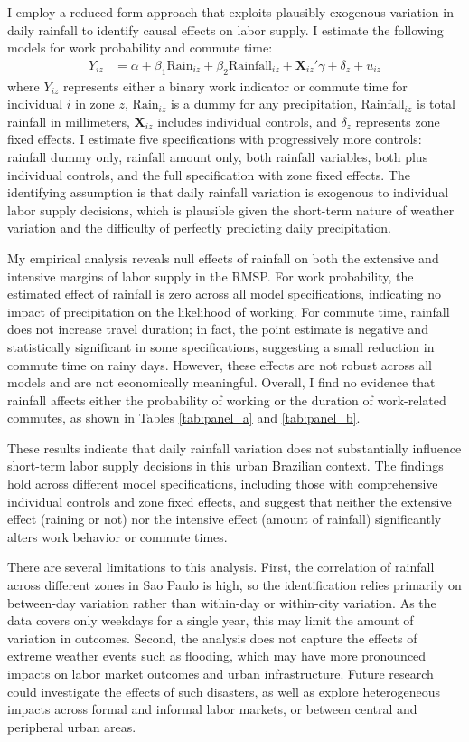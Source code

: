 I employ a reduced-form approach that exploits plausibly exogenous variation in daily rainfall to identify causal effects on labor supply. I estimate the following models for work probability and commute time:
\begin{align*}
Y_{iz} &= \alpha + \beta_1 \text{Rain}_{iz} + \beta_2 \text{Rainfall}_{iz} + \mathbf{X}_{iz}'\gamma + \delta_z + u_{iz}
\end{align*}
where $Y_{iz}$ represents either a binary work indicator or commute time for individual $i$ in zone $z$, $\text{Rain}_{iz}$ is a dummy for any precipitation, $\text{Rainfall}_{iz}$ is total rainfall in millimeters, $\mathbf{X}_{iz}$ includes individual controls, and $\delta_z$ represents zone fixed effects. I estimate five specifications with progressively more controls: rainfall dummy only, rainfall amount only, both rainfall variables, both plus individual controls, and the full specification with zone fixed effects. The identifying assumption is that daily rainfall variation is exogenous to individual labor supply decisions, which is plausible given the short-term nature of weather variation and the difficulty of perfectly predicting daily precipitation.

My empirical analysis reveals null effects of rainfall on both the extensive and intensive margins of labor supply in the RMSP. For work probability, the estimated effect of rainfall is zero across all model specifications, indicating no impact of precipitation on the likelihood of working. For commute time, rainfall does not increase travel duration; in fact, the point estimate is negative and statistically significant in some specifications, suggesting a small reduction in commute time on rainy days. However, these effects are not robust across all models and are not economically meaningful. Overall, I find no evidence that rainfall affects either the probability of working or the duration of work-related commutes, as shown in Tables \ref{tab:panel_a} and \ref{tab:panel_b}.

These results indicate that daily rainfall variation does not substantially influence short-term labor supply decisions in this urban Brazilian context. The findings hold across different model specifications, including those with comprehensive individual controls and zone fixed effects, and suggest that neither the extensive effect (raining or not) nor the intensive effect (amount of rainfall) significantly alters work behavior or commute times.  

There are several limitations to this analysis. First, the correlation of rainfall across different zones in Sao Paulo is high, so the identification relies primarily on between-day variation rather than within-day or within-city variation. As the data covers only weekdays for a single year, this may limit the amount of variation in outcomes. Second, the analysis does not capture the effects of extreme weather events such as flooding, which may have more pronounced impacts on labor market outcomes and urban infrastructure. Future research could investigate the effects of such disasters, as well as explore heterogeneous impacts across formal and informal labor markets, or between central and peripheral urban areas.



